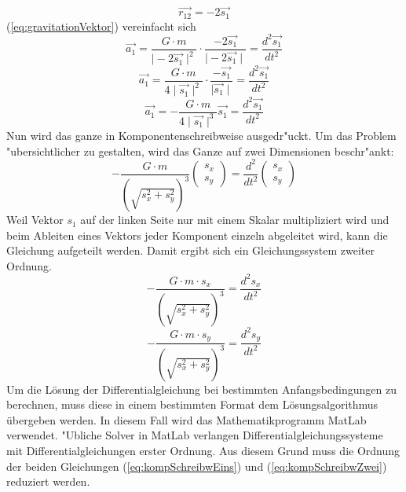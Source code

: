 \begin{refsection}
\begin{equation}
\vec{r_{12}}= -2\vec{s_1}
\end{equation}
(\ref{eq:gravitationVektor}) vereinfacht sich 
\begin{equation}
\vec{a_1} =\frac{G \cdot m}{\mid -2\vec{s_{1}}\mid ^2}\cdot \frac{-2\vec{s_{1}}}{\mid -2\vec{s_{1}}\mid}=  \frac{d^2 \vec{s_1}}{dt^2}
\end{equation}
\begin{equation}
\vec{a_1} =\frac{G \cdot m}{4\mid \vec{s_{1}}\mid ^2}\cdot \frac{-\vec{s_{1}}}{\mid \vec{s_{1}}\mid}=  \frac{d^2 \vec{s_1}}{dt^2}
\end{equation}
\begin{equation}
\vec{a_1} =-\frac{G \cdot m}{4\mid \vec{s_{1}}\mid ^3}{\vec{s_{1}}}= \frac{d^2 \vec{s_1}}{dt^2}
\end{equation}
Nun wird das ganze in Komponentenschreibweise ausgedr"uckt.
Um das Problem "ubersichtlicher zu gestalten, wird das Ganze auf zwei Dimensionen beschr"ankt:
\begin{equation}
-\frac{G \cdot m}{(\sqrt{s_x^2 + s_y^2})^3}
\begin{pmatrix}
s_x \\ s_y
\end{pmatrix}
=\frac{d^2}{dt^2}
\begin{pmatrix}
s_x \\ s_y
\end{pmatrix}
\end{equation}
Weil Vektor $s_1$ auf der linken Seite nur mit einem Skalar multipliziert wird und beim Ableiten eines Vektors jeder Komponent einzeln abgeleitet wird, kann die Gleichung aufgeteilt werden.
Damit ergibt sich ein Gleichungssystem zweiter Ordnung.
\begin{equation} \label{eq:kompSchreibwEins}
-\frac{G \cdot m \cdot s_x}{(\sqrt{s_x^2 + s_y^2})^3} = \frac{d^2s_x}{dt^2}
\end{equation}
\begin{equation} \label{eq:kompSchreibwZwei}
-\frac{G \cdot m \cdot s_y}{(\sqrt{s_x^2 + s_y^2})^3} = \frac{d^2s_y}{dt^2}
\end{equation}
Um die Lösung der Differentialgleichung bei bestimmten Anfangsbedingungen zu berechnen, muss diese in einem bestimmten Format dem Lösungsalgorithmus übergeben werden.
In diesem Fall wird das Mathematikprogramm MatLab verwendet. 
"Ubliche Solver in MatLab verlangen Differentialgleichungssysteme mit Differentialgleichungen erster Ordnung.
Aus diesem Grund muss die Ordnung der beiden Gleichungen (\ref{eq:kompSchreibwEins}) und (\ref{eq:kompSchreibwZwei}) reduziert werden.

\end{refsection}
